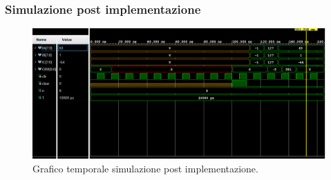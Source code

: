 \documentclass[12pt]{article}
\begin{document}
        \subsubsection{Simulazione post implementazione}
            \begin{figure}[ht]
                \centering
                \includegraphics[scale=0.55]{Test.png}
                \caption{Grafico temporale simulazione post implementazione.}
            \end{figure}
\end{document}
